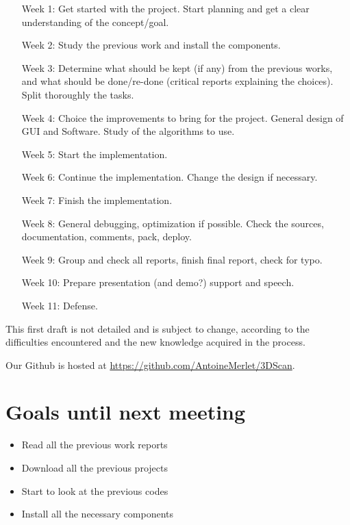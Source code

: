 \documentclass[aps,letterpaper,11pt]{revtex4}
\begin{document}
\begin{itemize}
\item[Week 1:] Get started with the project. Start planning and get a clear understanding of the concept/goal.
\item[Week 2:] Study the previous work and install the components.
\item[Week 3:]Determine what should be kept (if any) from the previous works, and what should be done/re-done (critical reports explaining the choices). Split thoroughly the tasks.
\item[Week 4:]Choice the improvements to bring for the project. General design of GUI and Software. Study of the algorithms to use.
\item[Week 5:]Start the implementation.
\item[Week 6:]Continue the implementation. Change the design if necessary.
\item[Week 7:]Finish the implementation.
\item[Week 8:]General debugging, optimization if possible. Check the sources, documentation, comments, pack, deploy.
\item[Week 9:]Group and check all reports, finish final report, check for typo.
\item[Week 10:]Prepare presentation (and demo?) support and speech.
\item[Week 11:]Defense.
\end{itemize}

This first draft is not detailed and is subject to change, according to the difficulties encountered and the new knowledge acquired in the process.

Our Github is hosted at \url{https://github.com/AntoineMerlet/3DScan}.

\section{Goals until next meeting}

\begin{itemize}
\item Read all the previous work reports
\item Download all the previous projects
\item Start to look at the previous codes
\item Install all the necessary components
\end{itemize}
\end{document}
